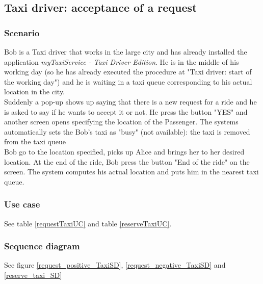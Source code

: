 \subsection{Taxi driver: acceptance of a request}
\subsubsection{Scenario}
Bob is a Taxi driver that works in the large city and has already installed the application \textit{myTaxiService - Taxi Driver Edition}.
He is in the middle of his working day (so he has already executed the procedure at "Taxi driver: start of the working day") and he is waiting in a taxi queue corresponding to his actual location in the city.\\
Suddenly a pop-up shows up saying that there is a new request for a ride and he is asked to say if he wants to accept it or not.
He press the button "YES" and another screen opens specifying the location of the Passenger. The systems automatically sets the Bob's taxi as "busy" (not available): the taxi is removed from the taxi queue\\
Bob go to the location specified, picks up Alice and brings her to her desired location. At the end of the ride, Bob press the button "End of the ride" on the screen. The system computes his actual location and puts him in the nearest taxi queue.

\subsubsection{Use case}
See table \ref{requestTaxiUC} and table \ref{reserveTaxiUC}.

\subsubsection{Sequence diagram}
See figure \ref{request_positive_TaxiSD}, \ref{request_negative_TaxiSD} and \ref{reserve_taxi_SD}